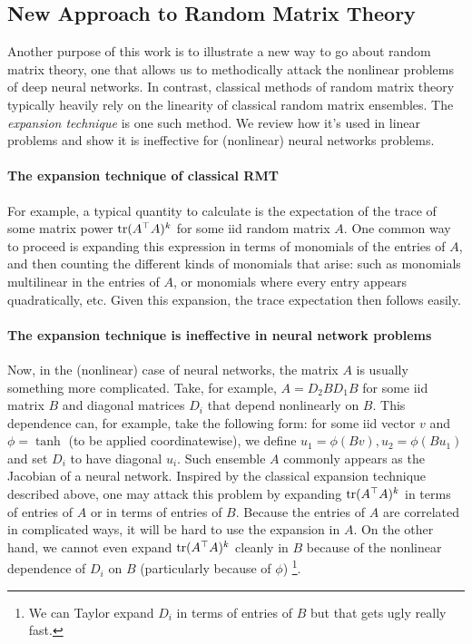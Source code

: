 \documentclass{article}
\theoremstyle{definition}
\theoremstyle{remark}
\newcommand{\trsp}{\top}
\begin{document}
\subsection{New Approach to Random Matrix Theory}
\label{sec:newRMT}
Another purpose of this work is to illustrate a new way to go about random matrix theory, one that allows us to methodically attack the nonlinear problems of deep neural networks. In contrast, classical methods of random matrix theory typically heavily rely on the linearity of classical random matrix ensembles.
The \emph{expansion technique} is one such method.
We review how it's used in linear problems and show it is ineffective for (nonlinear) neural networks problems.

\paragraph{The expansion technique of classical RMT}
For example, a typical quantity to calculate is the expectation of the trace of some matrix power $\tr(A^{\trsp}A)^{k}$ for some iid random matrix $A$. One common way to proceed is expanding this expression in terms of monomials of the entries of $A$, and then counting the different kinds of monomials that arise: such as monomials multilinear in the entries of $A$, or monomials where every entry appears quadratically, etc. 
Given this expansion, the trace expectation then follows easily.

\paragraph{The expansion technique is ineffective in neural network problems}
Now, in the (nonlinear) case of neural networks, the matrix $A$ is usually something more complicated.
Take, for example, $A=D_{2}BD_{1}B$ for some iid matrix $B$ and diagonal matrices $D_{i}$ that depend nonlinearly on $B$.
This dependence can, for example, take the following form: for some iid vector $v$ and $\phi=\tanh$ (to be applied coordinatewise), we define $u_{1}=\phi(Bv),u_{2}=\phi(Bu_{1})$ and set $D_{i}$ to have diagonal $u_{i}$.
Such ensemble $A$ commonly appears as the Jacobian of a neural network.
Inspired by the classical expansion technique described above, one may attack this problem by expanding $\tr(A^{\trsp}A)^{k}$ in terms of entries of $A$ or in terms of entries of $B$. Because the entries of $A$ are correlated in complicated ways, it will be hard to use the expansion in $A$. On the other hand, we cannot even expand $\tr(A^{\trsp}A)^{k}$ cleanly in $B$ because of the nonlinear dependence of $D_{i}$ on $B$ (particularly because of $\phi$)%
\footnote{We can Taylor expand $D_{i}$ in terms of entries of $B$ but that gets ugly really fast.}.
\end{document}
